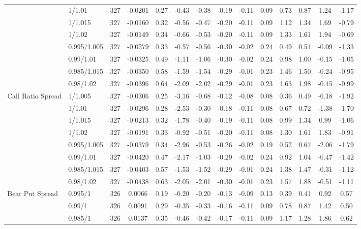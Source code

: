 \begin{tabular}{llcccccccccccc}
 & 1/1.01 & 327 & -0.0201 & 0.27 & -0.43 & -0.38 & -0.19 & -0.11 & 0.09 & 0.73 & 0.87 & 1.24 & -1.17 \\
 & 1/1.015 & 327 & -0.0160 & 0.32 & -0.56 & -0.47 & -0.20 & -0.11 & 0.09 & 1.12 & 1.34 & 1.69 & -0.79 \\
 & 1/1.02 & 327 & -0.0149 & 0.34 & -0.66 & -0.53 & -0.20 & -0.11 & 0.09 & 1.33 & 1.61 & 1.94 & -0.69 \\
 & 0.995/1.005 & 327 & -0.0279 & 0.33 & -0.57 & -0.56 & -0.30 & -0.02 & 0.24 & 0.49 & 0.51 & -0.09 & -1.33 \\
 & 0.99/1.01 & 327 & -0.0325 & 0.49 & -1.11 & -1.06 & -0.30 & -0.02 & 0.24 & 0.98 & 1.00 & -0.15 & -1.05 \\
 & 0.985/1.015 & 327 & -0.0350 & 0.58 & -1.59 & -1.54 & -0.29 & -0.01 & 0.23 & 1.46 & 1.50 & -0.24 & -0.95 \\
 & 0.98/1.02 & 327 & -0.0396 & 0.64 & -2.09 & -2.02 & -0.29 & -0.01 & 0.23 & 1.63 & 1.98 & -0.45 & -0.99 \\
Call Ratio Spread & 1/1.005 & 327 & -0.0306 & 0.25 & -3.16 & -0.68 & -0.12 & -0.08 & 0.08 & 0.36 & 0.49 & -6.18 & -1.92 \\
 & 1/1.01 & 327 & -0.0296 & 0.28 & -2.53 & -0.30 & -0.18 & -0.11 & 0.08 & 0.67 & 0.72 & -1.38 & -1.70 \\
 & 1/1.015 & 327 & -0.0213 & 0.32 & -1.78 & -0.40 & -0.19 & -0.11 & 0.08 & 0.99 & 1.34 & 0.99 & -1.06 \\
 & 1/1.02 & 327 & -0.0191 & 0.33 & -0.92 & -0.51 & -0.20 & -0.11 & 0.08 & 1.30 & 1.61 & 1.83 & -0.91 \\
 & 0.995/1.005 & 327 & -0.0379 & 0.34 & -2.96 & -0.53 & -0.26 & -0.02 & 0.19 & 0.52 & 0.67 & -2.06 & -1.79 \\
 & 0.99/1.01 & 327 & -0.0420 & 0.47 & -2.17 & -1.03 & -0.29 & -0.02 & 0.24 & 0.92 & 1.04 & -0.47 & -1.42 \\
 & 0.985/1.015 & 327 & -0.0403 & 0.57 & -1.53 & -1.52 & -0.29 & -0.01 & 0.24 & 1.38 & 1.47 & -0.31 & -1.12 \\
 & 0.98/1.02 & 327 & -0.0438 & 0.63 & -2.05 & -2.01 & -0.30 & -0.01 & 0.23 & 1.57 & 1.88 & -0.51 & -1.11 \\
Bear Put Spread & 0.995/1 & 326 & 0.0066 & 0.19 & -0.20 & -0.20 & -0.13 & -0.09 & 0.13 & 0.39 & 0.41 & 0.92 & 0.57 \\
 & 0.99/1 & 326 & 0.0091 & 0.29 & -0.35 & -0.33 & -0.16 & -0.11 & 0.09 & 0.78 & 0.87 & 1.42 & 0.50 \\
 & 0.985/1 & 326 & 0.0137 & 0.35 & -0.46 & -0.42 & -0.17 & -0.11 & 0.09 & 1.17 & 1.28 & 1.86 & 0.62 \\

\end{tabular}
